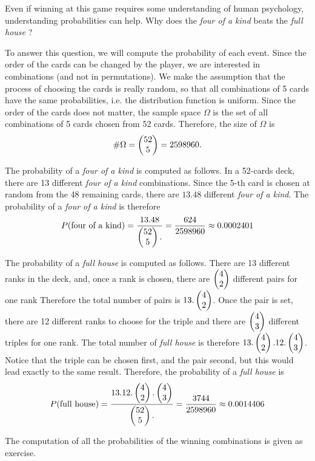 Even if winning at this game requires some understanding of human 
psychology, understanding probabilities can help. 
Why does the \emph{four of a kind} beats the \emph{full house} ?

To answer this question, we will compute the probability of each event.
Since the order of the cards can be changed by the player, we are interested 
in combinations (and not in permutations).
We make the assumption that the process of choosing the cards is really random,
so that all combinations of 5 cards have the same probabilities, i.e.
the distribution function is uniform.
Since the order of the cards does not matter, the sample space $\Omega$ 
is the set of all combinations of 5 cards chosen from 52 cards. Therefore, 
the size of $\Omega$ is
\begin{eqnarray}
\#{\Omega} = \choosefun{52}{5} = 2598960.
\end{eqnarray}

The probability of a \emph{four of a kind} is computed as follows.
In a 52-cards deck, there are 13 different \emph{four of a kind} combinations.
Since the 5-th card is chosen at random from the 48 remaining cards, there 
are $13.48$ different \emph{four of a kind}. The probability of a \emph{four of a kind} is 
therefore 
\begin{eqnarray}
P(\textrm{four of a kind}) = \frac{13.48}{\choosefun{52}{5}.} 
= \frac{624}{2598960} \approx 0.0002401
\end{eqnarray}

The probability of a \emph{full house} is computed as follows.
There are 13 different ranks in the deck, and, once a rank is chosen, there
are $\choosefun{4}{2}$ different pairs for one rank Therefore the total number 
of pairs is $13.\choosefun{4}{2}$. Once the pair is set, there are 
12 different ranks to choose for the triple and there are $\choosefun{4}{3}$
different triples for one rank. The total number of \emph{full house} is 
therefore $13.\choosefun{4}{2}.12.\choosefun{4}{3}$. Notice that the 
triple can be chosen first, and the pair second, but this would lead
exactly to the same result. Therefore, the probability of a \emph{full house} is
\begin{eqnarray}
P(\textrm{full house}) 
= \frac{13.12.\choosefun{4}{2}.\choosefun{4}{3}}{\choosefun{52}{5}.} 
= \frac{3744}{2598960}
\approx 0.0014406
\end{eqnarray}

The computation of all the probabilities of the winning combinations 
is given as exercise.

